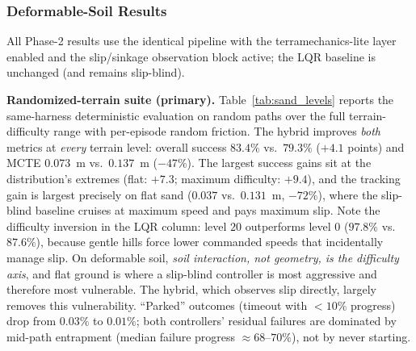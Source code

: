 \documentclass[conference]{IEEEtran}
\begin{document}
\subsubsection{Deformable-Soil Results}
\label{sec:sandresults}
All Phase-2 results use the identical pipeline with the terramechanics-lite layer enabled and the slip/sinkage observation block active; the LQR baseline is unchanged (and remains slip-blind).

\vspace{1mm}
\noindent\textbf{Randomized-terrain suite (primary).} Table~\ref{tab:sand_levels} reports the same-harness deterministic evaluation on random paths over the full terrain-difficulty range with per-episode random friction. The hybrid improves \emph{both} metrics at \emph{every} terrain level: overall success $83.4\%$ vs.\ $79.3\%$ ($+4.1$ points) and MCTE $0.073$~m vs.\ $0.137$~m ($-47\%$). The largest success gains sit at the distribution's extremes (flat: $+7.3$; maximum difficulty: $+9.4$), and the tracking gain is largest precisely on flat sand ($0.037$ vs.\ $0.131$~m, $-72\%$), where the slip-blind baseline cruises at maximum speed and pays maximum slip. Note the difficulty inversion in the LQR column: level $20$ outperforms level $0$ ($97.8\%$ vs.\ $87.6\%$), because gentle hills force lower commanded speeds that incidentally manage slip. On deformable soil, \emph{soil interaction, not geometry, is the difficulty axis}, and flat ground is where a slip-blind controller is most aggressive and therefore most vulnerable. The hybrid, which observes slip directly, largely removes this vulnerability. ``Parked'' outcomes (timeout with $<\!10\%$ progress) drop from $0.03\%$ to $0.01\%$; both controllers' residual failures are dominated by mid-path entrapment (median failure progress $\approx\!68$--$70\%$), not by never starting.
\end{document}
